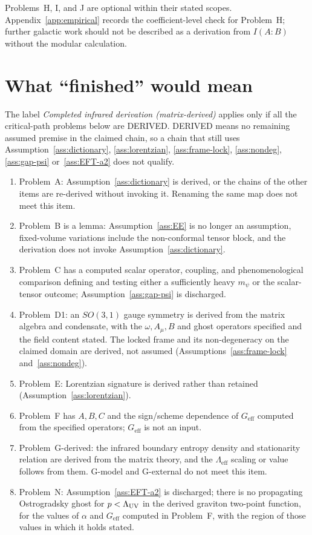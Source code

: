 Problems~H, I, and J are optional within their stated scopes.
Appendix~\ref{app:empirical} records the coefficient-level check for
Problem~H; further galactic work should not be described as a
derivation from \(I(A:B)\) without the modular calculation.

\section{What ``finished'' would mean}
\label{sec:ch17-done}

The label \emph{Completed infrared derivation (matrix-derived)}
applies only if all the critical-path problems below are DERIVED.
DERIVED means no remaining assumed premise in the claimed chain, so
a chain that still uses Assumption~\ref{ass:dictionary},
\ref{ass:lorentzian}, \ref{ass:frame-lock}, \ref{ass:nondeg},
\ref{ass:gap-psi} or~\ref{ass:EFT-a2} does not qualify.

\begin{enumerate}
  \item Problem~A: Assumption~\ref{ass:dictionary} is derived, or
        the chains of the other items are re-derived without
        invoking it. Renaming the same map does not meet this item.
  \item Problem~B is a lemma: Assumption~\ref{ass:EE} is no longer an
        assumption, fixed-volume variations include the
        non-conformal tensor block, and the derivation does not
        invoke Assumption~\ref{ass:dictionary}.
  \item Problem~C has a computed scalar operator, coupling, and
        phenomenological comparison defining and testing either a
        sufficiently heavy \(m_\psi\) or the scalar-tensor outcome;
        Assumption~\ref{ass:gap-psi} is discharged.
  \item Problem~D1: an \(SO(3,1)\) gauge symmetry is derived from the
        matrix algebra and condensate, with the \(\omega,A_\mu,B\)
        and ghost operators specified and the field content stated.
        The locked frame and its non-degeneracy on the claimed
        domain are derived, not assumed
        (Assumptions~\ref{ass:frame-lock} and~\ref{ass:nondeg}).
  \item Problem~E: Lorentzian signature is derived rather than
        retained (Assumption~\ref{ass:lorentzian}).
  \item Problem~F has \(A,B,C\) and the sign/scheme dependence of
        \(G_{\mathrm{eff}}\) computed from the specified operators;
        \(G_{\mathrm{eff}}\) is not an input.
  \item Problem~G-derived: the infrared boundary entropy density
        and stationarity relation are derived from the matrix theory,
        and the \(\Lambda_{\mathrm{eff}}\) scaling or value follows
        from them. G-model and G-external do not meet this item.
  \item Problem~N: Assumption~\ref{ass:EFT-a2} is discharged; there
        is no propagating Ostrogradsky ghost for \(p<\Lambda_{\mathrm{UV}}\) in the
        derived graviton two-point function, for the values of
        \(\alpha\) and \(G_{\mathrm{eff}}\) computed in Problem~F,
        with the region of those values in which it holds stated.
\end{enumerate}

